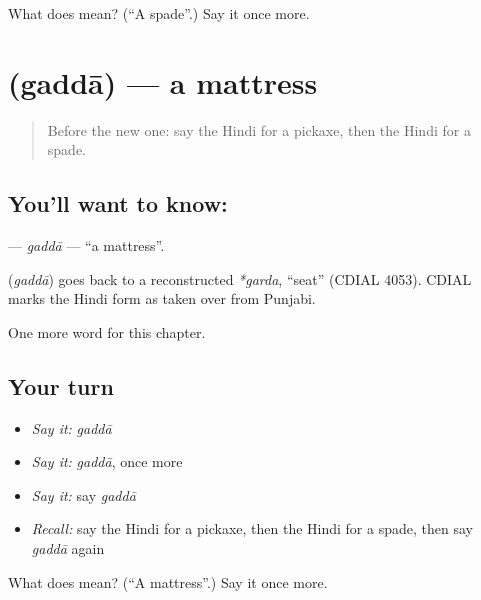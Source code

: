 \begin{tcolorbox}[breakable,colback=teal!4,colframe=teal!35!black,title={Before you move on}]
What does  mean? (\textquotedblleft{}A spade\textquotedblright{}.) Say it once more.
\end{tcolorbox}
\section[\texorpdfstring{\hi{गद्दा} (gaddā)}{गद्दा (gaddā)}]{ (gaddā) — a mattress}

\label{lesson:HI-C266-gadda}



\begin{quote}
Before the new one: say the Hindi for a pickaxe, then the Hindi for a spade.
\end{quote}

\subsection*{You'll want to know: }
\textbf{} — \emph{gaddā} — \textquotedblleft{}a mattress\textquotedblright{}.

\begin{cousinweb}
\textbf{} (\emph{gaddā}) goes back to a reconstructed \emph{*garda}, \textquotedblleft{}seat\textquotedblright{} (CDIAL 4053). CDIAL marks the Hindi form as taken over from Punjabi.
\end{cousinweb}

\begin{grammarlens}[title={What you've built}]
One more word for this chapter.
\end{grammarlens}

\subsection*{Your turn}
\begin{itemize}
\raggedright
  \item \emph{Say it:} \emph{gaddā}
  \item \emph{Say it:} \emph{gaddā}, once more
  \item \emph{Say it:} say \emph{gaddā}
  \item \emph{Recall:} say the Hindi for a pickaxe, then the Hindi for a spade, then say \emph{gaddā} again
\end{itemize}

\begin{tcolorbox}[breakable,colback=teal!4,colframe=teal!35!black,title={Before you move on}]
What does  mean? (\textquotedblleft{}A mattress\textquotedblright{}.) Say it once more.
\end{tcolorbox}
